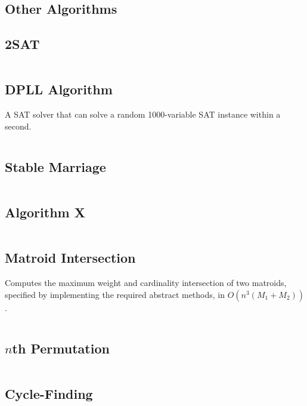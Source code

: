 \documentclass[8pt,a4paper,landscape,oneside]{amsart}
\newcommand{\code}[1]{\inputminted[fontsize=\normalsize,baselinestretch=1]{cpp}{_code/#1}}
\newif\ifverbose
\begin{document}
\begin{multicols*}{3}
\section{Other Algorithms}
    \subsection{2SAT}
        \ifverbose
        A fast 2SAT solver.
        \fi
        \code{other/two_sat.cpp}

    \subsection{DPLL Algorithm}
        A SAT solver that can solve a random 1000-variable SAT instance within a second.
        \code{other/dpll.cpp}

    \subsection{Stable Marriage}
        \ifverbose
        The Gale-Shapley algorithm for solving the stable marriage problem.
        \fi
        \code{other/stable_marriage.cpp}

    \subsection{Algorithm X}
        \ifverbose
        An implementation of Knuth's Algorithm X, using dancing links. Solves the Exact Cover problem.
        \fi
        \code{other/algorithm_x.cpp}

    \subsection{Matroid Intersection}
        Computes the maximum weight and cardinality intersection of two
        matroids, specified by implementing the required abstract methods, in
        $O(n^3(M_1+M_2))$.
        \code{other/matroid_intersection.cpp}

    \subsection{$n$th Permutation}
        \ifverbose
        A very fast algorithm for computing the $n$th permutation of the list
        $\{0,1,\ldots,k-1\}$.
        \fi
        \code{other/nth_permutation.cpp}

    \subsection{Cycle-Finding}
        \ifverbose
        An implementation of Floyd's Cycle-Finding algorithm.
        \fi
        \code{other/floyds_algorithm.cpp}


\end{multicols*}
\end{document}
